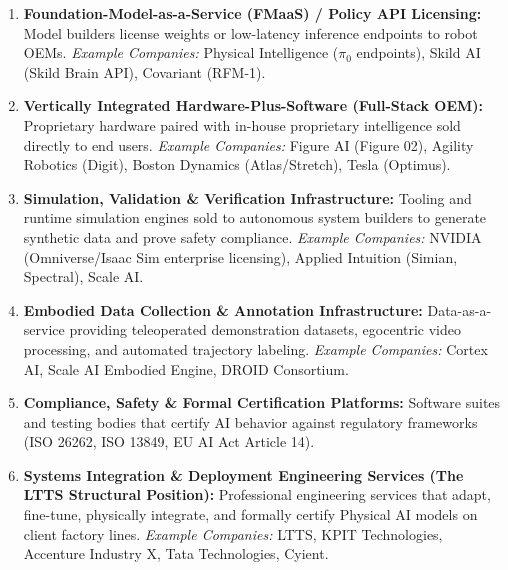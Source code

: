 \documentclass[11pt,a4paper]{article}
\begin{document}
\begin{enumerate}[label=(\alph*)]
    \item \textbf{Foundation-Model-as-a-Service (FMaaS) / Policy API Licensing:}
    Model builders license weights or low-latency inference endpoints to robot OEMs.
    \textit{Example Companies:} Physical Intelligence ($\pi_0$ endpoints), Skild AI (Skild Brain API), Covariant (RFM-1).
    \item \textbf{Vertically Integrated Hardware-Plus-Software (Full-Stack OEM):}
    Proprietary hardware paired with in-house proprietary intelligence sold directly to end users.
    \textit{Example Companies:} Figure AI (Figure 02), Agility Robotics (Digit), Boston Dynamics (Atlas/Stretch), Tesla (Optimus).
    \item \textbf{Simulation, Validation \& Verification Infrastructure:}
    Tooling and runtime simulation engines sold to autonomous system builders to generate synthetic data and prove safety compliance.
    \textit{Example Companies:} NVIDIA (Omniverse/Isaac Sim enterprise licensing), Applied Intuition (Simian, Spectral), Scale AI.
    \item \textbf{Embodied Data Collection \& Annotation Infrastructure:}
    Data-as-a-service providing teleoperated demonstration datasets, egocentric video processing, and automated trajectory labeling.
    \textit{Example Companies:} Cortex AI, Scale AI Embodied Engine, DROID Consortium.
    \item \textbf{Compliance, Safety \& Formal Certification Platforms:}
    Software suites and testing bodies that certify AI behavior against regulatory frameworks (ISO 26262, ISO 13849, EU AI Act Article 14).
    \item \textbf{Systems Integration \& Deployment Engineering Services (The LTTS Structural Position):}
    Professional engineering services that adapt, fine-tune, physically integrate, and formally certify Physical AI models on client factory lines.
    \textit{Example Companies:} LTTS, KPIT Technologies, Accenture Industry X, Tata Technologies, Cyient.
\end{enumerate}
\end{document}
